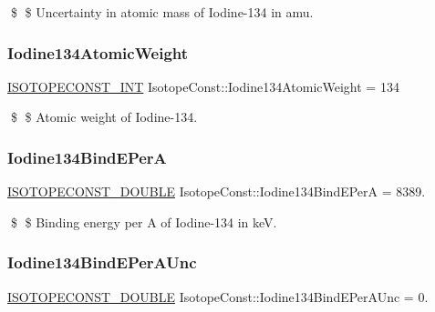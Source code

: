 \$ \$ Uncertainty in atomic mass of Iodine-\/134 in amu. \mbox{\label{group___isotope_const-_iodine-_i134_ga52a8e81f01332b1feee4a5b7215abf9c}} 
\subsubsection{\texorpdfstring{Iodine134\+Atomic\+Weight}{Iodine134AtomicWeight}}
{\footnotesize\ttfamily \mbox{\hyperlink{group___isotope_const-_macros_ga5f18360b3e99483a35c32d789e62621c}{I\+S\+O\+T\+O\+P\+E\+C\+O\+N\+S\+T\+\_\+\+I\+NT}} Isotope\+Const\+::\+Iodine134\+Atomic\+Weight = 134}

\$ \$ Atomic weight of Iodine-\/134. \mbox{\label{group___isotope_const-_iodine-_i134_ga4e7243321735f583a65f498cb819b797}} 
\subsubsection{\texorpdfstring{Iodine134\+Bind\+E\+PerA}{Iodine134BindEPerA}}
{\footnotesize\ttfamily \mbox{\hyperlink{group___isotope_const-_macros_ga8f45a7272ce02c0b4c65c44636ed719a}{I\+S\+O\+T\+O\+P\+E\+C\+O\+N\+S\+T\+\_\+\+D\+O\+U\+B\+LE}} Isotope\+Const\+::\+Iodine134\+Bind\+E\+PerA = 8389.}

\$ \$ Binding energy per A of Iodine-\/134 in keV. \mbox{\label{group___isotope_const-_iodine-_i134_gad8e834cd2eebad780a6045a055fc3cb1}} 
\subsubsection{\texorpdfstring{Iodine134\+Bind\+E\+Per\+A\+Unc}{Iodine134BindEPerAUnc}}
{\footnotesize\ttfamily \mbox{\hyperlink{group___isotope_const-_macros_ga8f45a7272ce02c0b4c65c44636ed719a}{I\+S\+O\+T\+O\+P\+E\+C\+O\+N\+S\+T\+\_\+\+D\+O\+U\+B\+LE}} Isotope\+Const\+::\+Iodine134\+Bind\+E\+Per\+A\+Unc = 0.}

